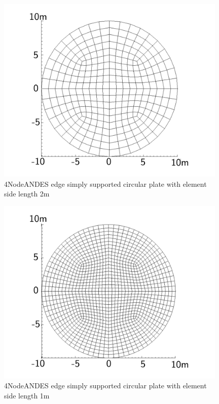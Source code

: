 \documentclass[fleqn,11pt]{article}
\begin{document}
\begin{figure}[H]
  \centering
  \includegraphics[width=11cm]{../Figure-files/circular_plate3.pdf}
  \caption{4NodeANDES edge simply supported circular plate with element side length 2m }
  \label{fig 4NodeANDES edges simply supported circular plate with element side length 2m }
\end{figure}

\newpage

\begin{figure}[H]
  \centering
  \includegraphics[width=11cm]{../Figure-files/circular_plate4.pdf}
  \caption{4NodeANDES edge simply supported circular plate with element side length 1m }
  \label{fig 4NodeANDES edges simply supported circular plate with element side length 1m }
\end{figure}
\end{document}
